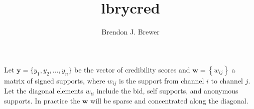 \documentclass[a4paper, 12pt]{article}
\title{lbrycred}
\author{Brendon J. Brewer}
\date{}
\begin{document}
\maketitle


\setlength{\parindent}{0pt}
\setlength{\parskip}{8pt}

Let $\boldsymbol{y} = \{y_1, y_2, ..., y_n\}$ be the vector of credibility
scores and $\boldsymbol{w} = \left\{w_{ij}\right\}$
a matrix of signed supports, where
$w_{ij}$ is the support from channel $i$ to channel $j$. Let the diagonal
elements $w_{ii}$ include the bid, self supports, and anonymous supports.
In practice the $\boldsymbol{w}$ will be sparse and concentrated along the
diagonal.





\end{document}
